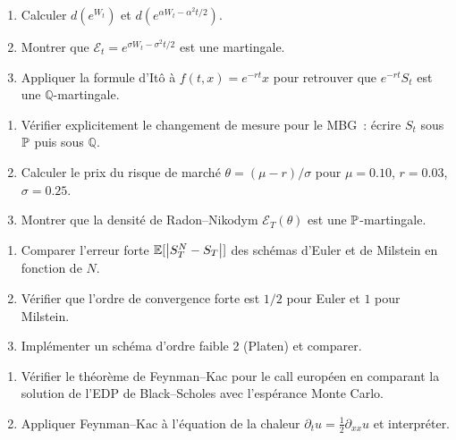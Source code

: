 \begin{exercice}[Formule d'It\^o]
\begin{enumerate}
    \item Calculer $d(e^{W_t})$ et $d(e^{\alpha W_t - \alpha^2 t/2})$.
    \item Montrer que $\mathcal{E}_t = e^{\sigma W_t - \sigma^2 t/2}$ est
          une martingale.
    \item Appliquer la formule d'It\^o \`a $f(t,x) = e^{-rt}x$ pour
          retrouver que $e^{-rt}S_t$ est une $\mathbb{Q}$-martingale.
\end{enumerate}
\end{exercice}

\begin{exercice}[Girsanov]
\begin{enumerate}
    \item V\'erifier explicitement le changement de mesure pour le MBG~:
          \'ecrire $S_t$ sous $\mathbb{P}$ puis sous $\mathbb{Q}$.
    \item Calculer le prix du risque de march\'e $\theta = (\mu-r)/\sigma$
          pour $\mu = 0.10$, $r = 0.03$, $\sigma = 0.25$.
    \item Montrer que la densit\'e de Radon--Nikodym $\mathcal{E}_T(\theta)$
          est une $\mathbb{P}$-martingale.
\end{enumerate}
\end{exercice}

\begin{exercice}
\begin{enumerate}
    \item Comparer l'erreur forte $\mathbb{E}[\left| S_T^N - S_T \right|]$ des sch\'emas
          d'Euler et de Milstein en fonction de $N$.
    \item V\'erifier que l'ordre de convergence forte est $1/2$ pour
          Euler et $1$ pour Milstein.
    \item Impl\'ementer un sch\'ema d'ordre faible 2 (Platen) et comparer.
\end{enumerate}
\end{exercice}

\begin{exercice}
\begin{enumerate}
    \item V\'erifier le th\'eor\`eme de Feynman--Kac pour le call
          europ\'een en comparant la solution de l'EDP de Black--Scholes
          avec l'esp\'erance Monte Carlo.
    \item Appliquer Feynman--Kac \`a l'\'equation de la chaleur
          $\partial_t u = \frac{1}{2}\partial_{xx}u$ et interpr\'eter.
\end{enumerate}
\end{exercice}
